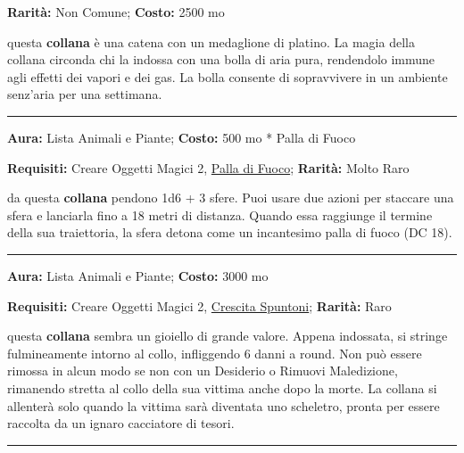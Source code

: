 \begin{multicols}{2}
\textbf{Rarità:} Non Comune; \textbf{Costo:} 2500 mo

questa \textbf{collana} è una catena con un medaglione di platino. La magia della collana circonda chi la indossa con una bolla di aria pura, rendendolo immune agli effetti dei vapori e dei gas. La bolla consente di sopravvivere in un ambiente senz'aria per una settimana.

\smallskip\noindent\rule{\linewidth}{2pt}  \hypertarget{CollanadellePallediFuoco}{}\medskip{}\noindent\label{CollanadellePallediFuoco}

\textbf{Aura:} Lista Animali e Piante; \textbf{Costo:} 500 mo * Palla di Fuoco

\textbf{Requisiti:} Creare Oggetti Magici 2, \hyperlink{Palla di Fuoco}{Palla di Fuoco}; \textbf{Rarità:} Molto Raro

da questa \textbf{collana} pendono 1d6 + 3 sfere. Puoi usare due azioni per staccare una sfera e lanciarla fino a 18 metri di distanza. Quando essa raggiunge il termine della sua traiettoria, la sfera detona come un incantesimo palla di fuoco (DC 18).

\smallskip\noindent\rule{\linewidth}{2pt}  \hypertarget{CollanadelloStrangolamento}{}\medskip{}\noindent\label{CollanadelloStrangolamento}

\textbf{Aura:} Lista Animali e Piante; \textbf{Costo:} 3000 mo

\textbf{Requisiti:} Creare Oggetti Magici 2, \hyperlink{Crescita Spuntoni}{Crescita Spuntoni}; \textbf{Rarità:} Raro

questa \textbf{collana} sembra un gioiello di grande valore. Appena indossata, si stringe fulmineamente intorno al collo, infliggendo 6 danni a round. Non può essere rimossa in alcun modo se non con un Desiderio o Rimuovi Maledizione, rimanendo stretta al collo della sua vittima anche dopo la morte. La collana si allenterà solo quando la vittima sarà diventata uno scheletro, pronta per essere raccolta da un ignaro cacciatore di tesori.

\smallskip\noindent\rule{\linewidth}{2pt}  \hypertarget{Coraggiosa}{}\medskip{}\noindent\label{Coraggiosa}


\end{multicols}
